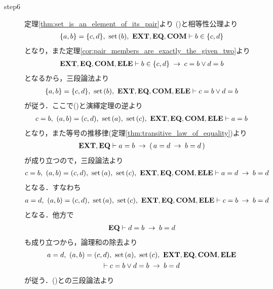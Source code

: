 \begin{sketch}
\begin{description}
			\item[step6] 定理\ref{thm:set_is_an_element_of_its_pair}より
				()と相等性公理より
				\begin{align}
					\{a,b\} = \{c,d\},\ \operatorname*{set}\hspace{0.15em}(b),\ \mbox{{\bf EXT}},\mbox{{\bf EQ}},\mbox{\bf COM} \vdash b \in \{c,d\}
				\end{align}
				となり，また定理\ref{cor:pair_members_are_exactly_the_given_two}より
				\begin{align}
					\mbox{{\bf EXT}},\mbox{{\bf EQ}},\mbox{\bf COM},\mbox{{\bf ELE}} \vdash b \in \{c,d\} \hspace{0.25em}\rightarrow\hspace{0.25em} c = b \vee d = b
				\end{align}
				となるから，三段論法より
				\begin{align}
					\{a,b\} = \{c,d\},\ \set{b},\ \EXTAX,\EQAX,\COMAX,\ELEAX \vdash c = b \vee d = b
					\label{fom:equality_of_ordered_pairs_10}
				\end{align}
				が従う．ここで()と演繹定理の逆より
				\begin{align}
					c = b,\ (a,b) = (c,d),\ \set{a},\ \set{c},\ \EXTAX,\EQAX,\COMAX,\ELEAX \vdash a = b
				\end{align}
				となり，また等号の推移律(定理\ref{thm:transitive_law_of_equality})より
				\begin{align}
					\mbox{{\bf EXT}},\mbox{{\bf EQ}} \vdash a = b \hspace{0.25em}\rightarrow\hspace{0.25em} (\, a = d \hspace{0.25em}\rightarrow\hspace{0.25em} b = d\, )
				\end{align}
				が成り立つので，三段論法より
				\begin{align}
					c = b,\ (a,b) = (c,d),\ \set{a},\ \set{c},\ \EXTAX,\EQAX,\COMAX,\ELEAX \vdash a = d \rarrow b = d
				\end{align}
				となる．すなわち
				\begin{align}
					a = d,\ (a,b) = (c,d),\ \set{a},\ \set{c},\ \EXTAX,\EQAX,\COMAX,\ELEAX \vdash c = b \rarrow b = d
				\end{align}
				となる．他方で
				\begin{align}
					\mbox{{\bf EQ}} \vdash d = b \hspace{0.25em}\rightarrow\hspace{0.25em} b = d
				\end{align}
				も成り立つから，論理和の除去より
				\begin{align}
					\begin{gathered}
						a = d,\ (a,b) = (c,d),\ \set{a},\ \set{c},\ \EXTAX,\EQAX,\COMAX,\ELEAX \\
						\vdash c = b \vee d = b \rarrow b = d
					\end{gathered}
				\end{align}
				が従う．()との三段論法より

\end{description}
\end{sketch}
